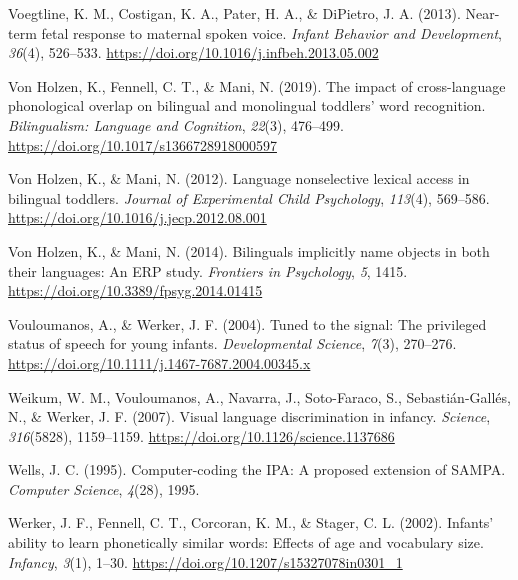 \documentclass[
  12pt,
  b5paperpaper,
  twoside]{scrreprt}
\newlength{\cslhangindent}
\newlength{\cslentryspacingunit} %
\newenvironment{CSLReferences}[2] %
 {%
  \setlength{\parindent}{0pt}
  \ifodd #1
  \let\oldpar\par
  \def\par{\hangindent=\cslhangindent\oldpar}
  \fi
  \setlength{\parskip}{#2\cslentryspacingunit}
 }%
 {}
\begin{document}
\begin{CSLReferences}{1}{0}
\leavevmode{}%
Voegtline, K. M., Costigan, K. A., Pater, H. A., \& DiPietro, J. A.
(2013). Near-term fetal response to maternal spoken voice. \emph{Infant
Behavior and Development}, \emph{36}(4), 526--533.
\url{https://doi.org/10.1016/j.infbeh.2013.05.002}

\leavevmode{}%
Von Holzen, K., Fennell, C. T., \& Mani, N. (2019). The impact of
cross-language phonological overlap on bilingual and monolingual
toddlers' word recognition. \emph{Bilingualism: Language and Cognition},
\emph{22}(3), 476--499. \url{https://doi.org/10.1017/s1366728918000597}

\leavevmode{}%
Von Holzen, K., \& Mani, N. (2012). Language nonselective lexical access
in bilingual toddlers. \emph{Journal of Experimental Child Psychology},
\emph{113}(4), 569--586.
\url{https://doi.org/10.1016/j.jecp.2012.08.001}

\leavevmode{}%
Von Holzen, K., \& Mani, N. (2014). Bilinguals implicitly name objects
in both their languages: An {ERP} study. \emph{Frontiers in Psychology},
\emph{5}, 1415. \url{https://doi.org/10.3389/fpsyg.2014.01415}

\leavevmode{}%
Vouloumanos, A., \& Werker, J. F. (2004). Tuned to the signal: The
privileged status of speech for young infants. \emph{Developmental
Science}, \emph{7}(3), 270--276.
\url{https://doi.org/10.1111/j.1467-7687.2004.00345.x}

\leavevmode{}%
Weikum, W. M., Vouloumanos, A., Navarra, J., Soto-Faraco, S.,
Sebastián-Gallés, N., \& Werker, J. F. (2007). Visual language
discrimination in infancy. \emph{Science}, \emph{316}(5828), 1159--1159.
\url{https://doi.org/10.1126/science.1137686}

\leavevmode{}%
Wells, J. C. (1995). Computer-coding the {IPA}: A proposed extension of
{SAMPA}. \emph{Computer Science}, \emph{4}(28), 1995.

\leavevmode{}%
Werker, J. F., Fennell, C. T., Corcoran, K. M., \& Stager, C. L. (2002).
Infants' ability to learn phonetically similar words: Effects of age and
vocabulary size. \emph{Infancy}, \emph{3}(1), 1--30.
\url{https://doi.org/10.1207/s15327078in0301_1}


\end{CSLReferences}
\end{document}
